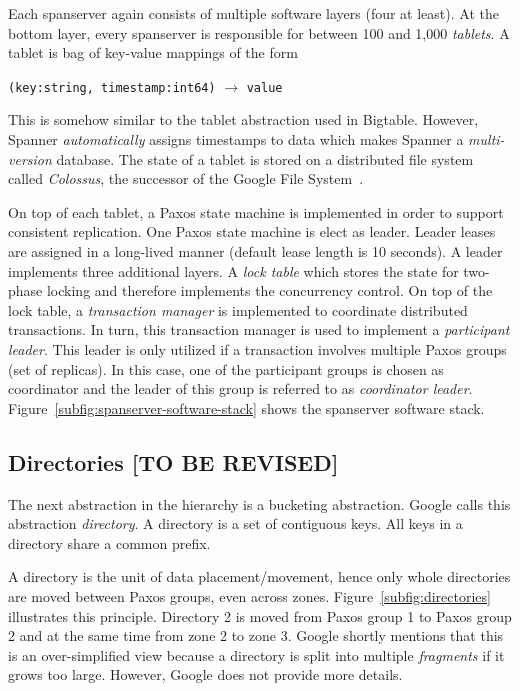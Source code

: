 \documentclass[onecolumn, a4paper, 10pt]{article}
\newcommand{\tbr}{{\color{red}\textbf{[TO BE REVISED]}}}
\begin{document}
Each spanserver again consists of multiple software layers (four at least). At
the bottom layer, every spanserver is responsible for between 100 and 1,000
\emph{tablets}. A tablet is bag of key-value mappings of the form
\begin{center}
  \texttt{(key:string, timestamp:int64)} $\rightarrow$ \texttt{value}
\end{center}
This is somehow similar to the tablet abstraction used in Bigtable. However,
Spanner \emph{automatically} assigns timestamps to data which makes Spanner a
\emph{multi-version} database. The state of a tablet is stored on a distributed
file system called \emph{Colossus}, the successor of the Google File
System~\cite{Ghemawat:2003}.

On top of each tablet, a Paxos state machine is implemented in order to support
consistent replication. One Paxos state machine is elect as leader. Leader leases
are assigned in a long-lived manner (default lease length is 10 seconds). A leader
implements three additional layers. A \emph{lock table} which stores the state
for two-phase locking and therefore implements the concurrency control. On top
of the lock table, a \emph{transaction manager} is implemented to coordinate
distributed transactions. In turn, this transaction manager is used to implement
a \emph{participant leader}. This leader is only utilized if a transaction
involves multiple Paxos groups (set of replicas). In this case, one of the
participant groups is chosen as coordinator and the leader of this group is
referred to as \emph{coordinator leader}.
Figure~\ref{subfig:spanserver-software-stack} shows the spanserver software stack.

\subsection{Directories \tbr}
\label{subsec:directories}

The next abstraction in the hierarchy is a bucketing abstraction. Google calls
this abstraction \emph{directory}. A directory is a set of contiguous keys.
All keys in a directory share a common prefix.

A directory is the unit of data placement/movement, hence only whole directories
are moved between Paxos groups, even across zones. Figure~\ref{subfig:directories}
illustrates this principle. Directory 2 is moved from Paxos group 1 to Paxos group
2 and at the same time from zone 2 to zone 3. Google shortly mentions that this
is an over-simplified view because a directory is split into multiple
\emph{fragments} if it grows too large. However, Google does not provide more
details.
\end{document}
